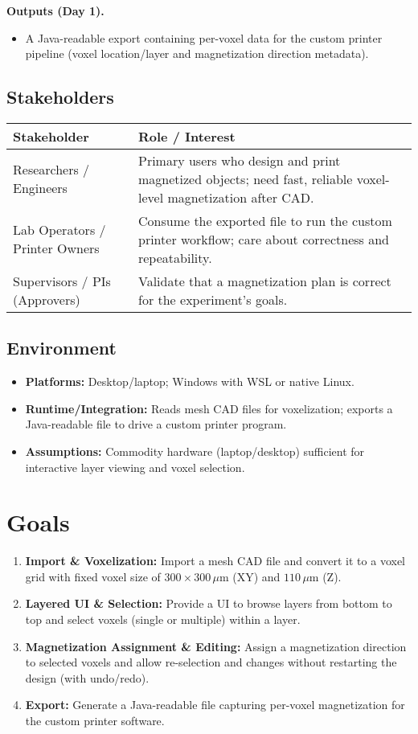 \documentclass{article}
\begin{document}
\noindent\textbf{Outputs (Day 1).}
\begin{itemize}
  \item A Java-readable export containing per-voxel data for the custom printer pipeline (voxel location/layer and magnetization direction metadata).
\end{itemize}


\subsection{Stakeholders}

\begin{tabularx}{\textwidth}{lX}
\toprule
\textbf{Stakeholder} & \textbf{Role / Interest}\\
\midrule
Researchers / Engineers & Primary users who design and print magnetized objects; need fast, reliable voxel-level magnetization after CAD.\\
Lab Operators / Printer Owners & Consume the exported file to run the custom printer workflow; care about correctness and repeatability.\\
Supervisors / PIs (Approvers) & Validate that a magnetization plan is correct for the experiment’s goals.\\
\bottomrule
\end{tabularx}
\subsection{Environment}
\begin{itemize}
  \item \textbf{Platforms:} Desktop/laptop; Windows with WSL or native Linux.
  \item \textbf{Runtime/Integration:} Reads mesh CAD files for voxelization; exports a Java-readable file to drive a custom printer program.
  \item \textbf{Assumptions:} Commodity hardware (laptop/desktop) sufficient for interactive layer viewing and voxel selection.
\end{itemize}



\section{Goals}
\begin{enumerate}
  \item \textbf{Import \& Voxelization:} Import a mesh CAD file and convert it to a voxel grid with fixed voxel size of $300 \times 300\,\mu\text{m}$ (XY) and $110\,\mu\text{m}$ (Z).
  \item \textbf{Layered UI \& Selection:} Provide a UI to browse layers from bottom to top and select voxels (single or multiple) within a layer.
  \item \textbf{Magnetization Assignment \& Editing:} Assign a magnetization direction to selected voxels and allow re-selection and changes without restarting the design (with undo/redo).
  \item \textbf{Export:} Generate a Java-readable file capturing per-voxel magnetization for the custom printer software.
\end{enumerate}
\end{document}
